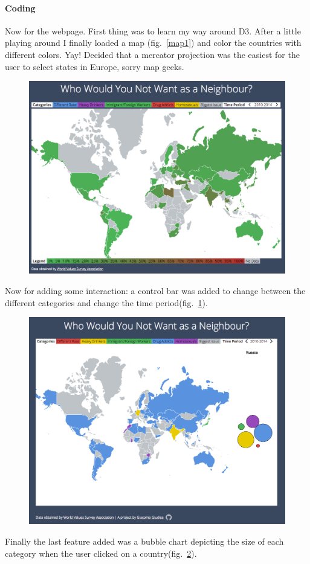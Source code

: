\documentclass[a4paper,12pt,twoside]{article}
\begin{document}
\paragraph{Coding} Now for the webpage.
First thing was to learn my way around D3. After a little playing around I finally loaded a map (fig.~\ref{map1}) and color the countries with different colors. Yay!
Decided that a mercator projection was the easiest for the user to select states in Europe, sorry map geeks.
\begin{figure}[h]
\centering
{
\includegraphics[width=12cm,angle=0]{map2.png}
}
\caption{\label{map2}}
\end{figure}

Now for adding some interaction: a control bar was added to change between the different categories and change the time period(fig.~\ref{map2}). 

\begin{figure}[h]
\centering
{
\includegraphics[width=12cm,angle=0]{map3.png}
}
\caption{\label{map3}}
\end{figure}
Finally the last feature added was a bubble chart depicting the size of each category when the user clicked on a country(fig.~\ref{map3}).
\end{document}
